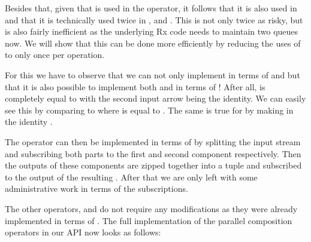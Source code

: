 Besides that, given that  is used in the  operator, it follows that it is also used in  and that it is technically used twice in \code{(***)}, \code{(\&\&\&)} and . This is not only twice as risky, but is also fairly inefficient as the underlying Rx code needs to maintain two queues now. We will show that this can be done more efficiently by reducing the uses of  to only once per  operation.

For this we have to observe that we can not only implement \code{(***)} in terms of  and  but that it is also possible to implement both  and  in terms of \code{(***)}! After all,  is completely equal to \code{(***)} with the second input arrow being the identity. We can easily see this by comparing  to  where  is equal to . The same is true for  by making  in  the identity \comp.

The \code{(***)} operator can then be implemented in terms of  by splitting the input stream and subscribing both parts to the first and second component respectively. Then the outputs of these components are zipped together into a tuple and subscribed to the output of the resulting \comp. After that we are only left with some administrative work in terms of the subscriptions.

The other operators, \code{(\&\&\&)} and  do not require any modifications as they were already implemented in terms of \code{(***)}. The full implementation of the parallel composition operators in our API now looks as follows:

